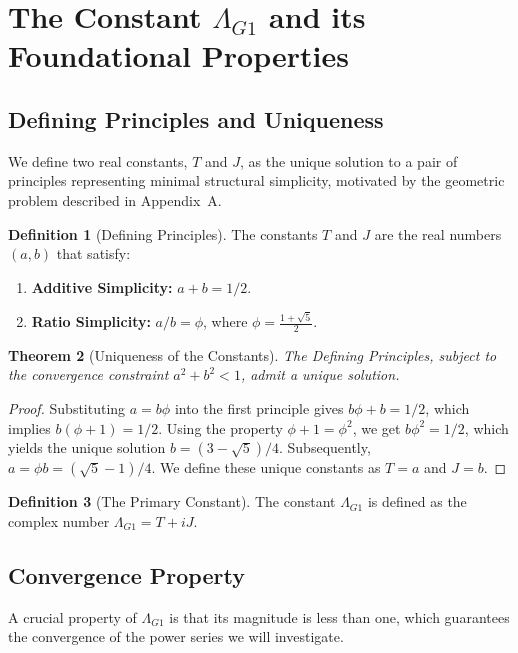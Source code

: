 \documentclass{amsart}
\theoremstyle{plain}
\newtheorem{theorem}{Theorem}[section]
\theoremstyle{definition}
\newtheorem{definition}[theorem]{Definition}
\theoremstyle{remark}
\newcommand{\LambdaG}{\Lambda_{G1}}
\begin{document}
\section{The Constant \texorpdfstring{$\Lambda_{G1}$}{Lambda\_G1} and its Foundational Properties}

\subsection{Defining Principles and Uniqueness}
We define two real constants, $T$ and $J$, as the unique solution to a pair of principles representing minimal structural simplicity, motivated by the geometric problem described in Appendix~A.

\begin{definition}[Defining Principles]
The constants $T$ and $J$ are the real numbers $(a,b)$ that satisfy:
\begin{enumerate}
    \item \textbf{Additive Simplicity:} $a+b = 1/2$.
    \item \textbf{Ratio Simplicity:} $a/b = \phi$, where $\phi = \frac{1+\sqrt{5}}{2}$.
\end{enumerate}
\end{definition}

\begin{theorem}[Uniqueness of the Constants]
The Defining Principles, subject to the convergence constraint $a^2+b^2 < 1$, admit a unique solution.
\end{theorem}
\begin{proof}
Substituting $a=b\phi$ into the first principle gives $b\phi+b=1/2$, which implies $b(\phi+1)=1/2$. Using the property $\phi+1=\phi^2$, we get $b\phi^2=1/2$, which yields the unique solution $b=(3-\sqrt{5})/4$. Subsequently, $a=\phi b = (\sqrt{5}-1)/4$. We define these unique constants as $T=a$ and $J=b$.
\end{proof}

\begin{definition}[The Primary Constant]
The constant $\LambdaG$ is defined as the complex number $\LambdaG = T+iJ$.
\end{definition}

\subsection{Convergence Property}
A crucial property of $\LambdaG$ is that its magnitude is less than one, which guarantees the convergence of the power series we will investigate.
\end{document}
